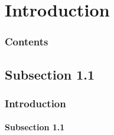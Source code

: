 
\section{Introduction}

	\begin{frame}
		\frametitle{Contents}
		\tableofcontents[currentsection]
	\end{frame}

\subsection{Subsection 1.1}

	\begin{frame}
		\frametitle{Introduction}
		\framesubtitle{Subsection 1.1}
	\end{frame}
